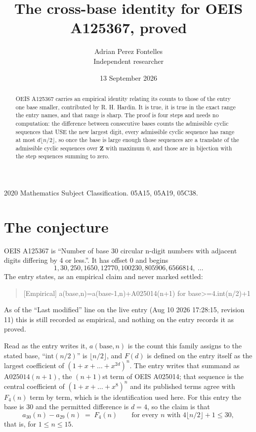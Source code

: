 \documentclass[11pt,a4paper]{article}
\title{The cross-base identity for OEIS A125367, proved}
\author{Adrian Perez Fontelles\\ \small Independent researcher}
\date{13 September 2026}
\theoremstyle{plain}
\theoremstyle{definition}
\begin{document}
\maketitle

\begin{abstract}
OEIS A125367 carries an empirical identity relating its counts to those of the entry one base
smaller, contributed by R. H. Hardin. It is true, it is true in the exact range the entry
names, and that range is sharp. The proof is four steps and needs no computation: the
difference between consecutive bases counts the admissible cyclic sequences that USE the new
largest digit, every admissible cyclic sequence has range at most $d\lfloor n/2\rfloor$, so
once the base is large enough those sequences are a translate of the admissible cyclic
sequences over $\mathbf{Z}$ with maximum $0$, and those are in bijection with the step
sequences summing to zero.
\end{abstract}

\noindent\small 2020 Mathematics Subject Classification. 05A15, 05A19, 05C38.\normalsize

\section{The conjecture}

OEIS A125367 is ``Number of base 30 circular n-digit numbers with adjacent digits differing by 4 or less.''. It has offset $0$ and begins
\[
1, 30, 250, 1650, 12770, 100230, 805906, 6566814,\ \dots
\]
The entry states, as an empirical claim and never marked settled:
\begin{quote}
[Empirical] a(base,n)=a(base-1,n)+A025014(n+1) for base>=4.int(n/2)+1
\end{quote}
As of the ``Last modified'' line on the live entry (Aug 10 2026 17:28:15, revision 11)
this is still recorded as empirical, and nothing on the entry records it as proved.

Read as the entry writes it, $a(\mathrm{base},n)$ is the count this family assigns to the
stated base, ``$\mathrm{int}(n/2)$'' is $\lfloor n/2\rfloor$, and $F(d)$ is defined on the
entry itself as the largest coefficient of $(1+x+\dots+x^{2d})^{n}$. The entry writes that summand as $\mathrm{A025014}(n+1)$, the $(n+1)$st term of OEIS A025014; that sequence is the central coefficient of $(1+x+\dots+x^{8})^{n}$ and its published terms agree with $F_{4}(n)$ term by term, which is the identification used here. For this entry
the base is $30$ and the permitted difference is $d=4$, so the claim is that
\[
a_{30}(n)-a_{29}(n)\;=\;F_{4}(n)
\qquad\text{for every } n \text{ with } 4\lfloor n/2\rfloor+1\le30,
\]
that is, for $1\le n\le15$.
\end{document}
